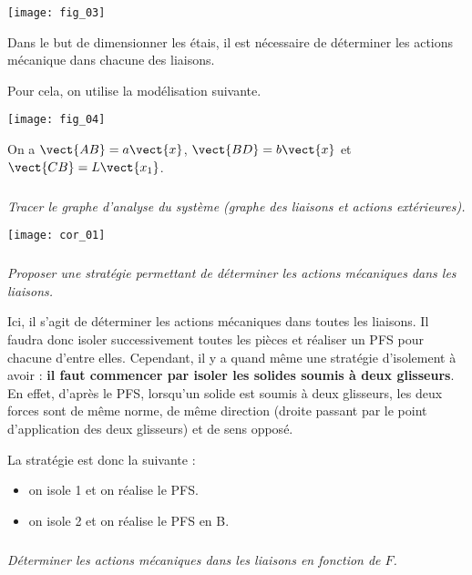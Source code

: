 \begin{multicols}{2}
\begin{multicols}{2}
\begin{center}
\texttt{[image: fig\_03]}
\end{center}

Dans le but de dimensionner les étais, il est nécessaire de déterminer les actions mécanique dans chacune des liaisons. 

Pour cela, on utilise la modélisation suivante. 

\begin{center}
\texttt{[image: fig\_04]}
\end{center}

On a $\vect{AB}=a \vect{x}$,  $\vect{BD}=b \vect{x}$ et  $\vect{CB}=L \vect{x_1}$.
\fi

\subparagraph{}\textit{Tracer le graphe d'analyse du système (graphe des liaisons et actions extérieures).}
\ifprof
\begin{corrige}
\begin{center}
\texttt{[image: cor\_01]}
\end{center}

\end{corrige}
\else
\fi

\subparagraph{}\textit{Proposer une stratégie permettant de déterminer les actions mécaniques dans les liaisons.}
\ifprof
\begin{corrige}
Ici, il s'agit de déterminer les actions mécaniques dans toutes les liaisons. Il faudra donc isoler successivement toutes les pièces et réaliser un PFS pour chacune d'entre elles. Cependant, il y a quand même une stratégie d'isolement à avoir : \textbf{il faut commencer par isoler les solides soumis à deux glisseurs}. En effet, d'après le PFS, lorsqu'un solide est soumis à deux glisseurs, les deux forces sont de même norme, de même direction (droite passant par le point d'application des deux glisseurs) et de sens opposé. 

La stratégie est donc la suivante : 
\begin{itemize}
\item on isole 1 et on réalise le PFS. 
\item on isole 2 et on réalise le PFS en B. 
\end{itemize} 


\end{corrige}
\else
\fi


\subparagraph{}\textit{Déterminer les actions mécaniques dans les liaisons en fonction de $F$.}
\ifprof
\begin{corrige}


\end{corrige}
\end{multicols}
\end{multicols}
